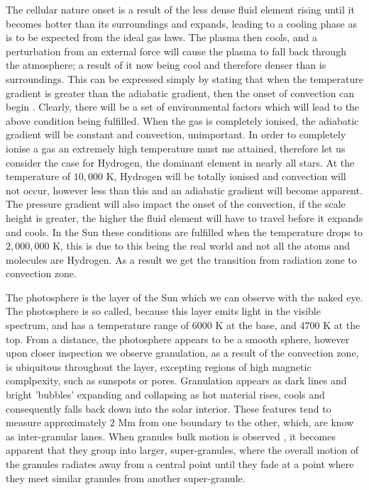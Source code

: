 The cellular nature onset is a result of the less dense fluid element rising until it becomes hotter than its surroundings and expands, leading to a cooling phase as is to be expected from the ideal gas laws.
The plasma then cools, and a perturbation from an external force will cause the plasma to fall back through the atmosphere; a result of it now being cool and therefore denser than is surroundings.
This can be expressed simply by stating that when the temperature gradient is greater than the adiabatic gradient, then the onset of convection can begin \cite{Hansen2004}.
Clearly, there will be a set of environmental factors which will lead to the above condition being fulfilled.
When the gas is completely ionised, the adiabatic gradient will be constant and convection, unimportant.
In order to completely ionise a gas an extremely high temperature must me attained, therefore let us consider the case for Hydrogen, the dominant element in nearly all stars.
At the temperature of $10,000$ K, Hydrogen will be totally ionised and convection will not occur, however less than this and an adiabatic gradient will become apparent.
The pressure gradient will also impact the onset of the convection, if the scale height is greater, the higher the fluid element will have to travel before it expands and cools.
In the Sun these conditions are fulfilled when the temperature drops to $2,000,000$ K, this is due to this being the real world and not all the atoms and molecules are Hydrogen.
As a result we get the transition from radiation zone to convection zone.

The photosphere is the layer of the Sun which we can observe with the naked eye.
The photosphere is so called, because this layer emits light in the visible spectrum, and has a temperature range of $6000$ K at the base, and $4700$ K at the top. 
From a distance, the photosphere appears to be a smooth sphere, however upon closer inspection we observe granulation, as a result of the convection zone, is ubiquitous throughout the layer, excepting regions of high magnetic complpexity, such as sunspots or pores.
Granulation appears as dark lines and bright 'bubbles' expanding and collapsing as hot material rises, cools and consequently falls back down into the solar interior.
These features tend to measure approximately $2$ Mm from one boundary to the other, which, are know as inter-granular lanes.
When granules bulk motion is observed , it becomes apparent that they group into larger, super-granules, where the overall motion of the granules radiates away from a central point until they fade at a point where they meet similar granules from another super-granule.

